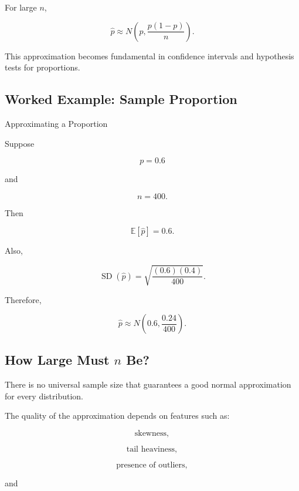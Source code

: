 For large \(n\),

\[
\boxed{
\widehat{p}
\approx
N
\left(
p,
\frac{
p(1-p)
}{n}
\right).
}
\]

This approximation becomes fundamental in confidence intervals and
hypothesis tests for proportions.

\subsection{Worked Example: Sample Proportion}
\label{subsec:worked-sample-proportion-clt}

\begin{workedexamplebox}{Approximating a Proportion}

Suppose

\[
p=0.6
\]

and

\[
n=400.
\]

Then

\[
\mathbb{E}[\widehat{p}]
=
0.6.
\]

Also,

\[
\operatorname{SD}(\widehat{p})
=
\sqrt{
\frac{
(0.6)(0.4)
}{400}
}.
\]

Therefore,

\begin{answerbox}
\[
\boxed{
\widehat{p}
\approx
N
\left(
0.6,
\frac{0.24}{400}
\right).
}
\]
\end{answerbox}

\end{workedexamplebox}

\subsection{How Large Must \(n\) Be?}
\label{subsec:how-large-n-clt}

There is no universal sample size that guarantees a good normal
approximation for every distribution.

The quality of the approximation depends on features such as:

\[
\text{skewness},
\]

\[
\text{tail heaviness},
\]

\[
\text{presence of outliers},
\]

and

